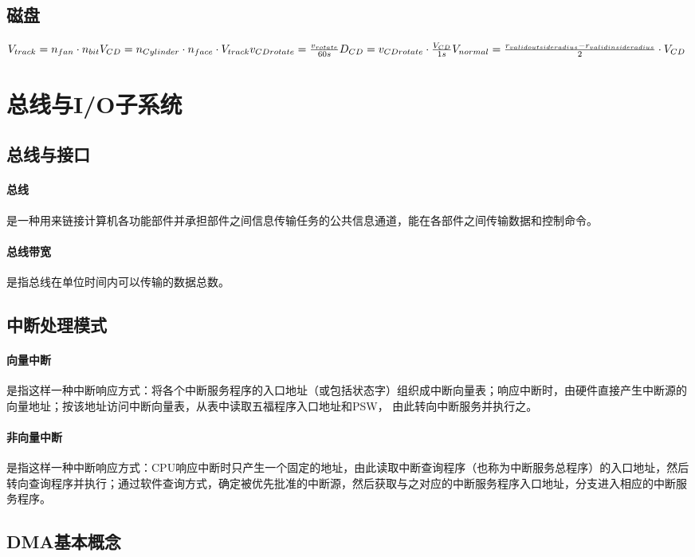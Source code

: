 \documentclass[a4paper, 12pt, oneside]{ctexart}
\begin{document}
	\subsection{磁盘}
	$V_{track} =  n_{fan} \cdot n_{bit}\\
	V_{CD} = n_{Cylinder} \cdot n_{face} \cdot V_{track}\\
	v_{CDrotate} = \frac{v_{rotate}}{60s}\\
	D_{CD} = v_{CDrotate} \cdot \frac{V_{CD}}{1s}\\
	V_{normal} = \frac{r_{valid outside radius} - r_{valid inside radius}}{2} \cdot V_{CD}$
	
	
	\section{总线与I/O子系统}
	\subsection{总线与接口}
	\paragraph{总线}
	是一种用来链接计算机各功能部件并承担部件之间信息传输任务的公共信息通道，能在各部件之间传输数据和控制命令。
	\paragraph{总线带宽}
	是指总线在单位时间内可以传输的数据总数。
	\subsection{中断处理模式}
	\paragraph{向量中断}
	是指这样一种中断响应方式：将各个中断服务程序的入口地址（或包括状态字）组织成中断向量表；响应中断时，由硬件直接产生中断源的向量地址；按该地址访问中断向量表，从表中读取五福程序入口地址和PSW， 由此转向中断服务并执行之。
	\paragraph{非向量中断}
	是指这样一种中断响应方式：CPU响应中断时只产生一个固定的地址，由此读取中断查询程序（也称为中断服务总程序）的入口地址，然后转向查询程序并执行；通过软件查询方式，确定被优先批准的中断源，然后获取与之对应的中断服务程序入口地址，分支进入相应的中断服务程序。
	\subsection{DMA基本概念}
\end{document}
